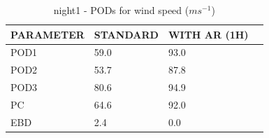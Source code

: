 \begin{table}[h!]
\begin{center}
\begin{tabular}{|l|l|l|l|}
\hline
\multicolumn{1}{|c|}{\cellcolor[HTML]{C0C0C0}\textbf{PARAMETER}} & \multicolumn{1}{c|}{\cellcolor[HTML]{C0C0C0}\textbf{STANDARD}} & \multicolumn{1}{c|}{\cellcolor[HTML]{C0C0C0}\textbf{WITH AR (1H)}} \\
\hline
\cellcolor[HTML]{C0C0C0}POD1  & 59.0                                & 93.0         \\
\cellcolor[HTML]{C0C0C0}POD2  & 53.7                                & 87.8         \\
\cellcolor[HTML]{C0C0C0}POD3  & 80.6                                & 94.9         \\
\cellcolor[HTML]{C0C0C0}PC    & 64.6                                  & 92.0           \\
\cellcolor[HTML]{C0C0C0}EBD   & 2.4                                 & 0.0          \\
\hline
\end{tabular}
\caption{night1 - PODs for wind speed ($m s^{-1}$)}
\label{tab:podws:night1}
\end{center}
\end{table}
